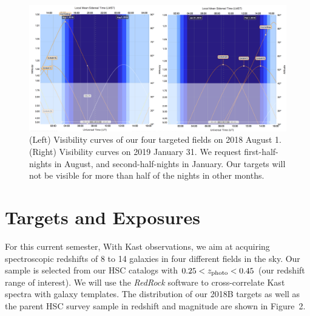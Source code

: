 \documentclass[letterpaper,12pt]{article}
\begin{document}
\begin{figure}[hbt]
\includegraphics[width=\textwidth]{visibility/2018B.pdf}
\caption{
(Left) Visibility curves of our four targeted fields on 2018 August 1. (Right) Visibility curves on 2019 January 31. We 
request first-half-nights in August, and second-half-nights in January. Our targets will not be visible for more than half 
of the nights in other months.}
\end{figure}

\clearpage

\section{Targets and Exposures}

For this current semester, With Kast observations, we aim at acquiring spectroscopic redshifts of 8 to 14 galaxies in four 
different fields in the sky. Our sample is selected from our HSC catalogs with  $0.25<z_{\rm photo}<0.45$ (our redshift 
range of interest).
We will use the {\it RedRock} software to cross-correlate Kast spectra with galaxy
templates. The distribution of our 2018B targets as well as the parent HSC survey sample in redshift and magnitude are 
shown in Figure~2. 
\end{document}
